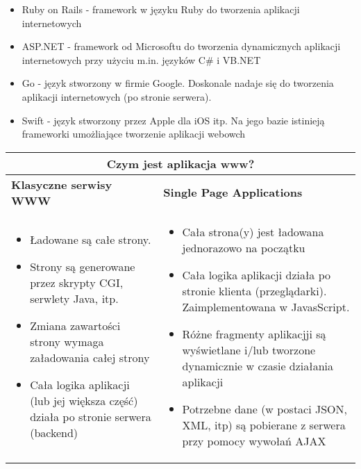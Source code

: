 \documentclass[../main.tex]{subfiles}
\begin{document}
\begin{itemize}
\begin{itemize}
            \item Ruby on Rails - framework w języku Ruby do tworzenia aplikacji internetowych
            \item ASP.NET - framework od Microsoftu do tworzenia dynamicznych aplikacji internetowych przy użyciu m.in. języków C\# i VB.NET
            \item Go - język stworzony w firmie Google. Doskonale nadaje się do tworzenia aplikacji internetowych (po stronie serwera).
            \item Swift - język stworzony przez Apple dla iOS itp. Na jego bazie istinieją frameworki umożliające tworzenie aplikacji webowch
        \end{itemize}
    \end{itemize}


    \begin{table}[H]
        \begin{center}
            \begin{tabular}{|p{8cm}|p{8cm}|}
                \hline
                \multicolumn{2}{|c|}{\textbf{Czym jest aplikacja www?}}\\
                \hline
                \textbf{Klasyczne serwisy WWW} & \textbf{Single Page Applications}\\
                \hline
                \hline
                \begin{itemize}
                    \item Ładowane są całe strony.
                    \item Strony są generowane przez skrypty CGI, serwlety Java, itp.
                    \item Zmiana zawartości strony wymaga załadowania całej strony
                    \item Cała logika aplikacji (lub jej większa część) działa po stronie serwera (backend)
                \end{itemize}
                &
                \begin{itemize}
                    \item Cała strona(y) jest ładowana jednorazowo na początku
                    \item Cała logika aplikacji działa po stronie klienta (przeglądarki). Zaimplementowana w JavasScript.
                    \item Różne fragmenty aplikacjji są wyświetlane i/lub tworzone dynamicznie w czasie działania aplikacji
                    \item Potrzebne dane (w postaci JSON, XML, itp) są pobierane z serwera przy pomocy wywołań AJAX
                \end{itemize}\\
                \hline
            \end{tabular}
        \end{center}
    \end{table}
\end{document}
